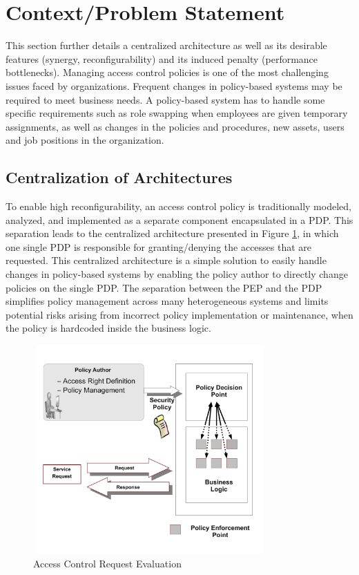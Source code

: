
\section{Context/Problem Statement} \label{sec:context}
This section further details a centralized architecture as well as its desirable features (synergy, reconfigurability) and its induced penalty (performance bottlenecks). 
Managing access control policies is one of the most challenging issues faced by organizations. Frequent changes in policy-based systems may be required to meet business needs. 
A policy-based system has to handle some specific requirements such as role swapping when employees are given temporary assignments, as well as changes in the policies and procedures, 
new assets, users and job positions in the organization.

\subsection{Centralization of Architectures}
To enable high reconfigurability, an access control policy is traditionally modeled, analyzed, and implemented as a separate component 
encapsulated in a PDP. This separation leads to the centralized architecture presented in Figure \ref{pep-pdp}, in which one single PDP is responsible for granting/denying the accesses that are requested. 
This centralized architecture is a simple solution to easily handle changes in policy-based systems by enabling the policy author 
to directly change policies on the single PDP. The separation between the PEP and the PDP simplifies policy management across many heterogeneous systems and limits
potential risks arising from incorrect policy implementation or maintenance, when the policy is hardcoded inside the business logic.
\begin{figure}[!h]
\begin{center}
\includegraphics[width=9cm, height=8cm]{business-logic}
\caption{Access Control Request Evaluation}
\label{pep-pdp}
\end{center}
\end{figure}
